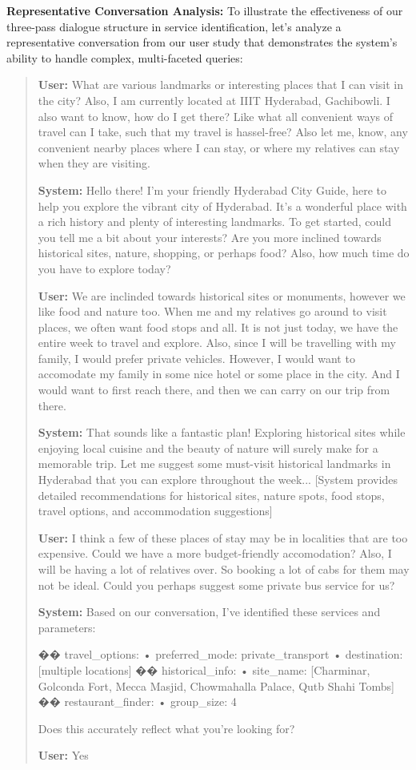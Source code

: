 
\textbf{Representative Conversation Analysis:}
To illustrate the effectiveness of our three-pass dialogue structure in service identification, let's analyze a representative conversation from our user study that demonstrates the system's ability to handle complex, multi-faceted queries:

\begin{quote}
\textbf{User:} What are various landmarks or interesting places that I can visit in the city? Also, I am currently located at IIIT Hyderabad, Gachibowli. I also want to know, how do I get there? Like what all convenient ways of travel can I take, such that my travel is hassel-free? Also let me, know, any convenient nearby places where I can stay, or where my relatives can stay when they are visiting.

\textbf{System:} Hello there! I'm your friendly Hyderabad City Guide, here to help you explore the vibrant city of Hyderabad. It's a wonderful place with a rich history and plenty of interesting landmarks. To get started, could you tell me a bit about your interests? Are you more inclined towards historical sites, nature, shopping, or perhaps food? Also, how much time do you have to explore today?

\textbf{User:} We are inclinded towards historical sites or monuments, however we like food and nature too. When me and my relatives go around to visit places, we often want food stops and all. It is not just today, we have the entire week to travel and explore. Also, since I will be travelling with my family, I would prefer private vehicles. However, I would want to accomodate my family in some nice hotel or some place in the city. And I would want to first reach there, and then we can carry on our trip from there.

\textbf{System:} That sounds like a fantastic plan! Exploring historical sites while enjoying local cuisine and the beauty of nature will surely make for a memorable trip. Let me suggest some must-visit historical landmarks in Hyderabad that you can explore throughout the week...
[System provides detailed recommendations for historical sites, nature spots, food stops, travel options, and accommodation suggestions]

\textbf{User:} I think a few of these places of stay may be in localities that are too expensive. Could we have a more budget-friendly accomodation? Also, I will be having a lot of relatives over. So booking a lot of cabs for them may not be ideal. Could you perhaps suggest some private bus service for us?

\textbf{System:} Based on our conversation, I've identified these services and parameters:

�� travel\_options:
   • preferred\_mode: private\_transport
   • destination: [multiple locations]
�� historical\_info:
   • site\_name: [Charminar, Golconda Fort, Mecca Masjid, Chowmahalla Palace, Qutb Shahi Tombs]
�� restaurant\_finder:
   • group\_size: 4

Does this accurately reflect what you're looking for?

\textbf{User:} Yes
\end{quote}

